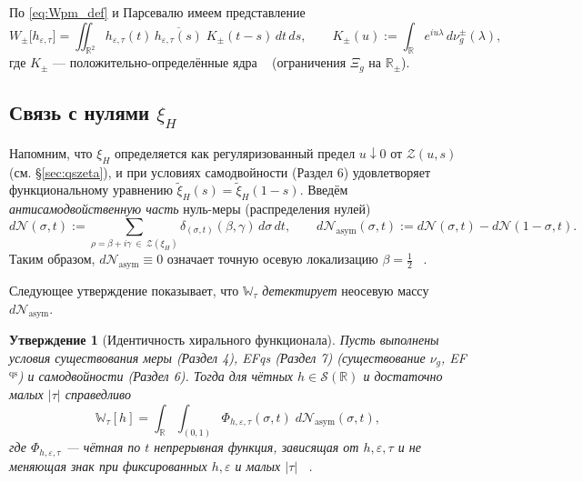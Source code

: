 \documentclass{article}
\numberwithin{equation}{section}
\theoremstyle{plain}
\newtheorem{proposition}{Утверждение}
\theoremstyle{definition}
\theoremstyle{remark}
\def\delta{δ}\def\Delta{Δ}\def\epsilon{ε}\def\zeta{ζ}%
\def\rho{ρ}\def\sigma{σ}\def\Sigma{Σ}\def\tau{τ}%
\begin{document}
По \eqref{eq:Wpm_def} и Парсевалю имеем представление
\begin{equation}
\label{eq:Wpm_alt}
W_\pm\!\big[h_{\varepsilon,\tau}\big]
=\iint_{\mathbb R^2}\!h_{\varepsilon,\tau}(t)\,\overline{h_{\varepsilon,\tau}(s)}\;
K_\pm(t-s)\,dt\,ds,\qquad
K_\pm(u):=\int_{\mathbb R}e^{iu\lambda}\,d\nu_g^\pm(\lambda),
\end{equation}
где $K_\pm$ — положительно-определённые ядра ~\cite{Akhiezer1965} (ограничения $\Xi_g$ на $\mathbb R_\pm$).

\subsection{\texorpdfstring{Связь с нулями $\xi_H$}{Связь с нулями xi_H}}


Напомним, что $\xi_H$ определяется как регуляризованный предел $u\downarrow 0$
от $\mathcal Z(u,s)$ (см. §\ref{sec:qszeta}), и при условиях самодвойности (Раздел 6)
удовлетворяет функциональному уравнению $\widetilde\xi_H(s)=\widetilde\xi_H(1-s)$.
Введём \emph{антисамодвойственную часть} нуль-меры (распределения нулей)
\begin{equation}
\label{eq:zero_measure}
d\mathcal N(\sigma,t):=\sum_{\rho=\beta+i\gamma\ \in\ \mathcal Z(\xi_H)}
\delta_{(\sigma,t)}(\beta,\gamma)\,d\sigma\,dt,
\qquad
d\mathcal N_{\mathrm{asym}}(\sigma,t):=d\mathcal N(\sigma,t)-d\mathcal N(1-\sigma,t).
\end{equation}
Таким образом, $d\mathcal N_{\mathrm{asym}}\equiv 0$ означает точную осевую локализацию $\beta=\tfrac12$ ~\cite{Bombieri2000}.

Следующее утверждение показывает, что $\mathbb W_\tau$ \emph{детектирует} неосевую массу $d\mathcal N_{\mathrm{asym}}$.

\begin{proposition}[Идентичность хирального функционала]
\label{prop:Wtau_identity}
Пусть выполнены условия существования меры (Раздел 4), EFqs (Раздел 7) (существование $\nu_g$, EF$^{\mathrm{qs}}$) и самодвойности (Раздел 6).
Тогда для чётных $h\in\mathcal S(\mathbb R)$ и достаточно малых $|\tau|$ справедливо
\begin{equation}
\label{eq:Wtau_zeros}
\mathbb W_\tau[h]
=\int_{\mathbb R}\!\!\int_{(0,1)} \Phi_{h,\varepsilon,\tau}(\sigma,t)\;d\mathcal N_{\mathrm{asym}}(\sigma,t),
\end{equation}
где $\Phi_{h,\varepsilon,\tau}$ — чётная по $t$ непрерывная функция,
зависящая от $h,\varepsilon,\tau$ и не меняющая знак при фиксированных $h,\varepsilon$ и малых $|\tau|$ ~\cite{GelfandVilenkinIV}.
\end{proposition}
\end{document}
